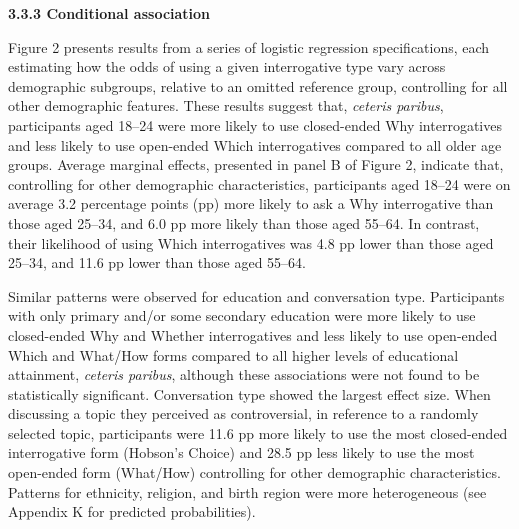 \documentclass[
  12pt,
]{article}
\begin{document}
\textbf{3.3.3 Conditional association}

Figure 2 presents results from a series of logistic regression specifications, each estimating how the odds of using a given interrogative type vary across demographic subgroups, relative to an omitted reference group, controlling for all other demographic features. These results suggest that, \emph{ceteris paribus}, participants aged 18--24 were more likely to use closed-ended Why interrogatives and less likely to use open-ended Which interrogatives compared to all older age groups. Average marginal effects, presented in panel B of Figure 2, indicate that, controlling for other demographic characteristics, participants aged 18--24 were on average 3.2 percentage points (pp) more likely to ask a Why interrogative than those aged 25--34, and 6.0 pp more likely than those aged 55--64. In contrast, their likelihood of using Which interrogatives was 4.8 pp lower than those aged 25--34, and 11.6 pp lower than those aged 55--64.

Similar patterns were observed for education and conversation type. Participants with only primary and/or some secondary education were more likely to use closed-ended Why and Whether interrogatives and less likely to use open-ended Which and What/How forms compared to all higher levels of educational attainment, \emph{ceteris paribus}, although these associations were not found to be statistically significant. Conversation type showed the largest effect size. When discussing a topic they perceived as controversial, in reference to a randomly selected topic, participants were 11.6 pp more likely to use the most closed-ended interrogative form (Hobson's Choice) and 28.5 pp less likely to use the most open-ended form (What/How) controlling for other demographic characteristics. Patterns for ethnicity, religion, and birth region were more heterogeneous (see Appendix K for predicted probabilities).
\end{document}

